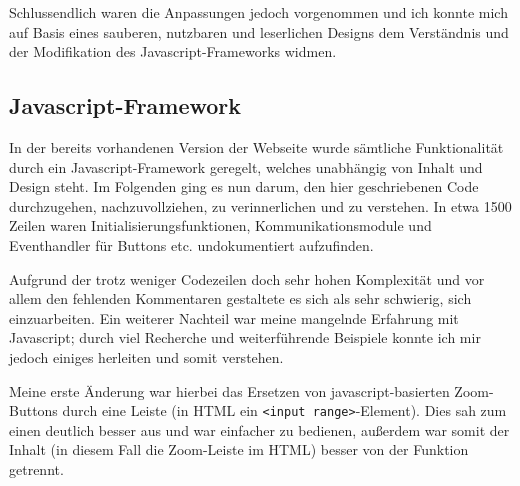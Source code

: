 \documentclass[xcolor=dvipsnames,11pt,paper=a4paper]{report}
\begin{document}
Schlussendlich waren die Anpassungen jedoch vorgenommen und ich konnte mich auf
Basis eines sauberen, nutzbaren und leserlichen Designs dem Verständnis und der
Modifikation des Javascript-Frameworks widmen.


\subsection{Javascript-Framework}
\label{subsec:ivs-einlesen-javascript}

In der bereits vorhandenen Version der Webseite wurde sämtliche Funktionalität durch
ein Javascript-Framework geregelt, welches unabhängig von Inhalt und Design steht.
Im Folgenden ging es nun darum, den hier geschriebenen Code durchzugehen, nachzuvollziehen,
zu verinnerlichen und zu verstehen. In etwa 1500 Zeilen waren Initialisierungsfunktionen,
Kommunikationsmodule und Eventhandler für Buttons etc. undokumentiert aufzufinden.

Aufgrund der trotz weniger Codezeilen doch sehr hohen Komplexität und vor allem
den fehlenden Kommentaren gestaltete es sich als sehr schwierig, sich einzuarbeiten.
Ein weiterer Nachteil war meine mangelnde Erfahrung mit Javascript; durch viel Recherche
und weiterführende Beispiele konnte ich mir jedoch einiges herleiten und somit verstehen.

Meine erste Änderung war hierbei das Ersetzen von javascript-basierten Zoom-Buttons
durch eine Leiste (in HTML ein \texttt{<input range>}-Element). Dies sah zum einen
deutlich besser aus und war einfacher zu bedienen, außerdem war somit der Inhalt
(in diesem Fall die Zoom-Leiste im HTML) besser von der Funktion getrennt.
\end{document}
